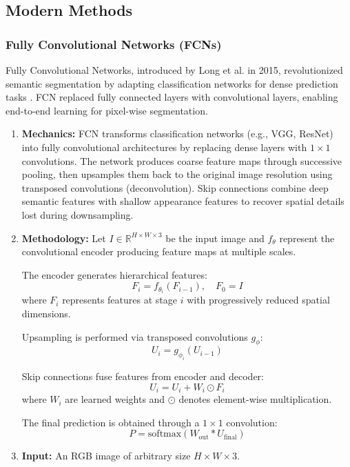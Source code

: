 \documentclass[conference]{IEEEtran}
\begin{document}
\subsection{Modern Methods}

\subsubsection{Fully Convolutional Networks (FCNs)}
Fully Convolutional Networks, introduced by Long et al. in 2015, revolutionized semantic segmentation by adapting classification networks for dense prediction tasks \cite{long2015fcn}. FCN replaced fully connected layers with convolutional layers, enabling end-to-end learning for pixel-wise segmentation.

\begin{enumerate}
	\item \textbf{Mechanics:}
	FCN transforms classification networks (e.g., VGG, ResNet) into fully convolutional architectures by replacing dense layers with $1 \times 1$ convolutions. The network produces coarse feature maps through successive pooling, then upsamples them back to the original image resolution using transposed convolutions (deconvolution). Skip connections combine deep semantic features with shallow appearance features to recover spatial details lost during downsampling.
	
	\item \textbf{Methodology:}
	Let $I \in \mathbb{R}^{H \times W \times 3}$ be the input image and $f_\theta$ represent the convolutional encoder producing feature maps at multiple scales.
	
	The encoder generates hierarchical features:
	\[
	F_i = f_{\theta_i}(F_{i-1}), \quad F_0 = I
	\]
	where $F_i$ represents features at stage $i$ with progressively reduced spatial dimensions.
	
	Upsampling is performed via transposed convolutions $g_\phi$:
	\[
	U_i = g_{\phi_i}(U_{i-1})
	\]
	
	Skip connections fuse features from encoder and decoder:
	\[
	U_i = U_i + W_i \odot F_i
	\]
	where $W_i$ are learned weights and $\odot$ denotes element-wise multiplication.
	
	The final prediction is obtained through a $1 \times 1$ convolution:
	\[
	P = \text{softmax}(W_{\text{out}} * U_{\text{final}})
	\]
	
	\item \textbf{Input:}
	An RGB image of arbitrary size $H \times W \times 3$.
	

\end{enumerate}
\end{document}
